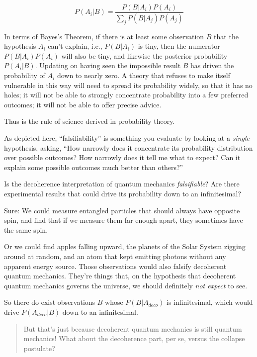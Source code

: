 \begin{equation*}
  P(A_i|B) = \frac{P(B|A_i)P(A_i)}
  {\sum_j P(B|A_j)P(A_j)}
\end{equation*}



\bigskip

{
 In terms of Bayes's Theorem, if there is at least
some observation $B$ that the hypothesis $A_{i}$
can't explain, i.e., $P(B|A_{i})$
is tiny, then the numerator
$P(B|A_{i})P(A_{i})$ will also be
tiny, and likewise the posterior probability
$P(A_{i}|B)$. Updating on having seen the
impossible result $B$ has driven the probability of $A_{i}$
down to nearly zero. A theory that refuses to make itself vulnerable in
this way will need to spread its probability widely, so that it has no
holes; it will not be able to strongly concentrate probability into a
few preferred outcomes; it will not be able to offer precise advice.}

{
 Thus is the rule of science derived in probability theory.}

{
 As depicted here,
``falsifiability'' is something you
evaluate by looking at a \textit{single} hypothesis, asking,
``How narrowly does it concentrate its probability
distribution over possible outcomes? How narrowly does it tell me what
to expect? Can it explain some possible outcomes much better than
others?''}

{
 Is the decoherence interpretation of quantum mechanics
\textit{falsifiable}? Are there experimental results that could drive
its probability down to an infinitesimal?}

{
 Sure: We could measure entangled particles that should always have
opposite spin, and find that if we measure them far enough apart, they
sometimes have the same spin.}

{
 Or we could find apples falling upward, the planets of the Solar
System zigging around at random, and an atom that kept emitting photons
without any apparent energy source. Those observations would also
falsify decoherent quantum mechanics. They're things
that, on the hypothesis that decoherent quantum mechanics governs the
universe, we should definitely \textit{not expect} to see.}

{
 So there do exist observations $B$ whose
$P(B|A_{deco})$ is infinitesimal, which would drive
$P(A_{deco}|B)$ down to an infinitesimal.}

\begin{quote}
{
 But that's just because decoherent quantum
mechanics is still quantum mechanics! What about the decoherence part,
per se, versus the collapse postulate?}
\end{quote}

